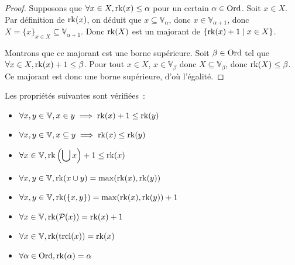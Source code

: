 \begin{proof}
  Supposons que $\forall x \in X, \operatorname{rk}(x) \leq \alpha$ pour un certain
  $\alpha\in\operatorname{Ord}$. Soit $x\in X$. Par définition de $\operatorname{rk}(x)$, on déduit que
  $x\subseteq \mathbb V_\alpha$, donc $x\in \mathbb V_{\alpha + 1}$, donc
  $X = \{x\}_{x\in X} \subseteq \mathbb V_{\alpha + 1}$. Donc $\operatorname{rk}(X)$ est
  un majorant de $\{\operatorname{rk}(x) + 1 \mid x \in X\}$.

  Montrons que ce majorant est une borne supérieure. Soit $\beta\in\operatorname{Ord}$ tel que
  $\forall x \in X, \operatorname{rk}(x) + 1 \leq \beta$. Pour tout
  $x\in X$, $x\in \mathbb V_\beta$ donc $X\subseteq \mathbb V_\beta$, donc
  $\operatorname{rk}(X) \leq \beta$. Ce majorant est donc une borne supérieure, d'où
  l'égalité.
\end{proof}

\begin{property}\label{prop.rg.oper}
  Les propriétés suivantes sont vérifiées~:
  \begin{itemize}
  \item $\forall x,y\in\mathbb V, x\in y \implies \operatorname{rk}(x) + 1 \leq \operatorname{rk}(y)$
  \item $\forall x,y\in\mathbb V, x\subseteq y \implies \operatorname{rk}(x) \leq \operatorname{rk}(y)$
  \item $\displaystyle \forall x\in\mathbb V,
    \operatorname{rk}\left(\bigcup x\right) + 1 \leq \operatorname{rk}(x)$
  \item $\forall x,y\in\mathbb V, \operatorname{rk}(x\cup y) = \max(\operatorname{rk}(x),\operatorname{rk}(y))$
  \item $\forall x,y\in\mathbb V, \operatorname{rk}(\{x,y\}) = \max(\operatorname{rk}(x),\operatorname{rk}(y)) + 1$
  \item $\forall x\in\mathbb V, \operatorname{rk}(\mathcal{P}(x)) = \operatorname{rk}(x) + 1$
  \item $\forall x\in\mathbb V, \operatorname{rk}(\operatorname{trcl}(x)) = \operatorname{rk}(x)$
  \item $\displaystyle \forall \alpha \in \operatorname{Ord}, \operatorname{rk}(\alpha) = \alpha$
  \end{itemize}
\end{property}

